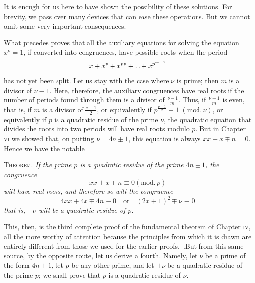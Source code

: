 It is enough for us here to have shown the possibility of these solutions. For brevity, we pass over many devices that can ease these operations. But we cannot omit some very important consequences.

What precedes proves that all the auxiliary equations for solving the equation $x^\nu=1$, if converted into congruences, have possible roots when the period
\[
x+x^p+x^{pp}+\mathinner{.\,.}+x^{p^{m-1}}
\]
has not yet been split. Let us stay with the case where $\nu$ is prime; then $m$ is a divisor of $\nu-1$. Here, therefore, the auxiliary congruences have real roots if the number of periods found through them is a divisor of $\frac{\nu-1}m$. Thus, if $\frac{\nu-1}m$ is even, that is, if $m$ is a divisor of $\frac{\nu-1}2$, or equivalently if $p^{\frac{\nu-1}2}\equiv1\;(\mathrm{mod.}\,\nu)$, or equivalently if $p$ is a quadratic residue of the prime $\nu$, the quadratic equation that divides the roots into two periods will have real roots modulo $p$. But in Chapter \textsc{vi} we showed that, on putting $\nu=4n\pm1$, this equation is always $xx+x\mp n=0$. Hence we have the notable

\textsc{Theorem.} \emph{If the prime $p$ is a quadratic residue of the prime $4n\pm1$, the congruence}
\[
xx+x\mp n\equiv0(\mathrm{mod.}\,p)
\]
\emph{will have real roots, and therefore so will the congruence}
\[
4xx+4x\mp4n\equiv0\quad\text{or}\quad(2x+1)^2\mp\nu\equiv0
\]
\emph{that is, $\pm\nu$ will be a quadratic residue of $p$.}

This, then, is the third complete proof of the fundamental theorem of Chapter \textsc{iv}, all the more worthy of attention because the principles from which it is drawn are entirely different from those we used for the earlier proofs.\ .But from this same source, by the opposite route, let us derive a fourth. Namely, let $\nu$ be a prime of the form $4n\pm1$, let $p$ be any other prime, and let $\pm\nu$ be a quadratic residue of the prime $p$; we shall prove that $p$ is a quadratic residue of $\nu$.

